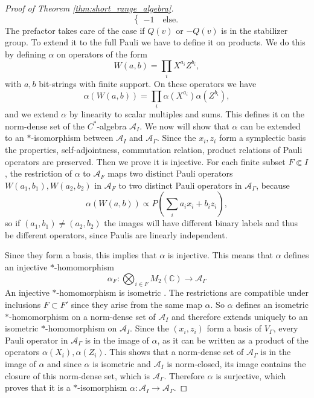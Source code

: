 \documentclass[aps,pra,reprint,superscriptaddress]{revtex4-2}
\newcommand{\cA}{{\mathcal A}}
\renewcommand\a{\alpha}
\newcommand\G{\Gamma}
\theoremstyle{definition}
\theoremstyle{remark}
\begin{document}
\begin{proof}[Proof of Theorem \ref{thm:short_range_algebra}]
\begin{equation}
\begin{cases}
        -1 \quad \text{else.} 
        \end{cases}
    \end{equation}
    The prefactor takes care of the case if $Q(v)$ or $-Q(v)$ is in the stabilizer group.
    To extend it to the full Pauli we have to define it on products. We do this by defining $\a$ on operators of the form
    \begin{equation}
        W(a,b) = \prod_{i} X^{a_i}Z^{b_i},
    \end{equation}
    with $a,b$ bit-strings with finite support. On these operators we have
    \begin{equation}
        \a(W(a,b)) = \prod_{i} \a(X^{a_i})\a(Z^{b_i}),
    \end{equation}
    and we extend $\a$ by linearity to scalar multiples and sums. This defines it on the norm-dense set of the $C^\ast$-algebra $\cA_I$. We now will show that $\a$ can be extended to an $\ast$-isomorphism between $\cA_I$ and $\cA_\G$.
    Since the $x_i,z_i$ form a symplectic basis the properties, self-adjointness, commutation relation, product relations of Pauli operators are preserved. 
    Then we prove it is injective. For each finite subset $F \Subset I$, the restriction of $\a$ to $\cA_F$ maps two distinct Pauli operators $W(a_1,b_1), W(a_2,b_2)$ in $\cA_F$ to two distinct Pauli operators in $\cA_\G$, because 
    \begin{equation}
        \a(W(a,b)) \propto P(\sum_i a_i x_i+b_i z_i),
    \end{equation}
    so if $(a_1,b_1) \neq (a_2,b_2)$ the images will have different binary labels and thus be different operators, since Paulis are linearly independent. 
    
    Since they form a basis, this implies that $\a$ is injective. This means that $\a$ defines an injective $\ast$-homomorphism 
    \begin{equation}
        \alpha_F: \bigotimes_{i \in F} M_2(\mathbb{C}) \rightarrow \cA_\G
    \end{equation}
    An injective $\ast$-homomorphism is isometric \cite{Blackadar}. 
    The restrictions are compatible under inclusions $F \subset F'$ since they arise from the same map $\a$. So $\a$ defines an isometric $\ast$-homomorphism on a norm-dense set of $\cA_I$ and therefore extends uniquely to an isometric $\ast$-homomorphism on $\cA_I$.
    Since the $(x_i,z_i)$ form a basis of $V_\G$, every Pauli operator in $\cA_\G$ is in the image of $\a$, as it can be written as a product of the operators $\a(X_i),\a(Z_i)$. This shows that a norm-dense set of $\cA_\G$ is in the image of $\a$ and since $\a$ is isometric and $\cA_I$ is norm-closed, its image contains the closure of this norm-dense set, which is $\cA_\G$. Therefore $\a$ is surjective, which proves that it is a $\ast$-isomorphism $\a:\cA_I \rightarrow \cA_\G$.
    

\end{proof}
\end{document}
